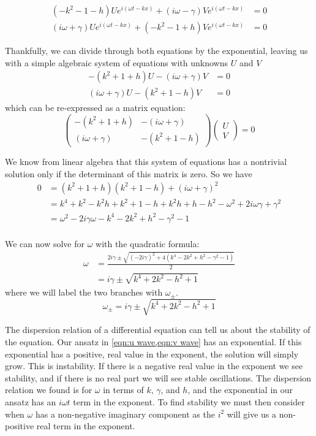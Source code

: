 \documentclass[11pt]{article}
\numberwithin{equation}{section}
\numberwithin{figure}{section}
\numberwithin{table}{section}
\begin{document}
\begin{align*}
    (-k^2-1-h)Ue^{i(\omega t-kx)}+(i\omega-\gamma)Ve^{i(\omega t-kx)}&=0\\
    (i\omega+\gamma)Ue^{i(\omega t-kx)}+(-k^2-1+h)Ve^{i(\omega t-kx)}&=0
\end{align*}
\par Thankfully, we can divide through both equations by the exponential, leaving us with a simple algebraic system of equations with unknowns $U$ and $V$
\begin{align*}
    -(k^2+1+h)U-(i\omega+\gamma)V&=0\\
    (i\omega+\gamma)U-(k^2+1-h)V&=0
\end{align*}
which can be re-expressed as a matrix equation:
\begin{equation}
    \begin{pmatrix}
        -(k^2+1+h) & -(i\omega+\gamma)\\
        (i\omega+\gamma) & -(k^2+1-h)
    \end{pmatrix}
    \begin{pmatrix}
        U\\
        V
    \end{pmatrix}
    =0
\end{equation}
\par We know from linear algebra that this system of equations has a nontrivial solution only if the determinant of this matrix is zero. So we have 
\begin{align*}
    0&=(k^2+1+h)(k^2+1-h)+(i\omega+\gamma)^2\\
    &=k^4+k^2-k^2h+k^2+1-h+k^2h+h-h^2-\omega^2+2i\omega\gamma+\gamma^2\\
    &=\omega^2-2i\gamma\omega-k^4-2k^2+h^2-\gamma^2-1\\
\end{align*}
\par We can now solve for $\omega$ with the quadratic formula:
\begin{align*}
    \omega&=\frac{2i\gamma\pm\sqrt{(-2i\gamma)^2+4(k^4-2k^2+h^2-\gamma^2-1)}}{2}\\
    &=i\gamma\pm\sqrt{k^4+2k^2-h^2+1}
\end{align*}
where we will label the two branches with $\omega_\pm$.
\begin{equation}
    \omega_\pm=i\gamma\pm\sqrt{k^4+2k^2-h^2+1}
    \label{eqn:dispersion relation}
\end{equation}
\par The dispersion relation of a differential equation can tell us about the stability of the equation. Our ansatz in \cref{eqn:u wave,eqn:v wave} has an exponential. If this exponential has a positive, real value in the exponent, the solution will simply grow. This is instability. If there is a negative real value in the exponent we see stability, and if there is no real part we will see stable oscillations. The dispersion relation we found is for $\omega$ in terms of $k$, $\gamma$, and $h$, and the exponential in our ansatz has an $i\omega t$ term in the exponent. To find stability we must then consider when $\omega$ has a non-negative imaginary component as the $i^2$ will give us a non-positive real term in the exponent.
\end{document}
